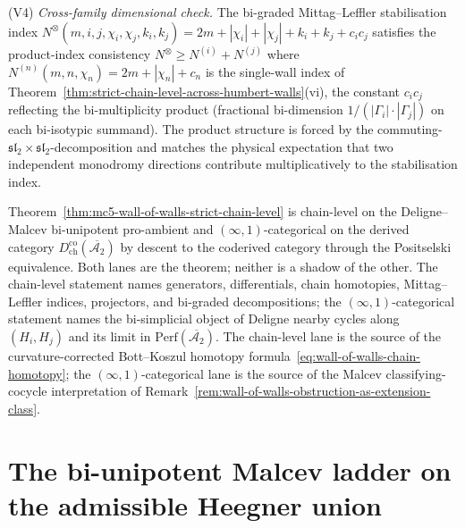 \begin{remark}
\textup{(V4)} \emph{Cross-family dimensional check.} The bi-graded
Mittag--Leffler stabilisation index
$N^{\otimes}(m,i,j,\chi_i,\chi_j,k_i,k_j)
= 2m+|\chi_i|+|\chi_j|+k_i+k_j+c_ic_j$
satisfies the product-index consistency
$N^{\otimes} \geq N^{(i)}+N^{(j)}$ where
$N^{(n)}(m,n,\chi_n) = 2m+|\chi_n|+c_n$ is the single-wall index of
Theorem~\textup{\ref{thm:strict-chain-level-across-humbert-walls}}(vi),
the constant $c_ic_j$ reflecting the bi-multiplicity product
(fractional bi-dimension $1/(|\Gamma_i|\cdot|\Gamma_j|)$ on each
bi-isotypic summand). The product structure is forced by the
commuting-$\mathfrak{sl}_2\times\mathfrak{sl}_2$-decomposition and
matches the physical expectation that two independent monodromy
directions contribute multiplicatively to the stabilisation index.
\end{remark}

\begin{remark}
\label{rem:mc5-wall-of-walls-scope}
Theorem~\textup{\ref{thm:mc5-wall-of-walls-strict-chain-level}} is
chain-level on the Deligne--Malcev bi-unipotent pro-ambient and
$(\infty,1)$-categorical on the derived category
$D^{\mathrm{co}}_{\mathrm{ch}}(\overline{\mathcal{A}_2})$ by descent
to the coderived category through the Positselski equivalence. Both
lanes are the theorem; neither is a shadow of the other. The
chain-level statement names generators, differentials, chain
homotopies, Mittag--Leffler indices, projectors, and bi-graded
decompositions; the $(\infty,1)$-categorical statement names the
bi-simplicial object of Deligne nearby cycles along $(H_i,H_j)$ and
its limit in $\mathrm{Perf}(\overline{\mathcal{A}_2})$. The
chain-level lane is the source of the curvature-corrected Bott--Koszul
homotopy formula~\textup{\eqref{eq:wall-of-walls-chain-homotopy}}; the
$(\infty,1)$-categorical lane is the source of the Malcev
classifying-cocycle interpretation of
Remark~\textup{\ref{rem:wall-of-walls-obstruction-as-extension-class}}.
\end{remark}

\section{The bi-unipotent Malcev ladder on the admissible Heegner union}
\label{sec:mc5-malcev-ladder-admissible-heegner}

